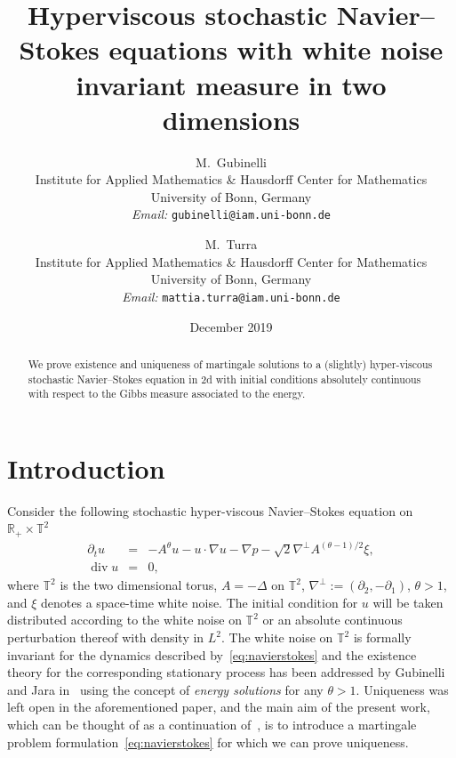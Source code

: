 \documentclass{article}
\newcommand{\assign}{:=}
\newcommand{\nosymbol}{}
\newcommand{\tmaffiliation}[1]{\\ #1}
\newcommand{\tmemail}[1]{\\ \textit{Email:} \texttt{#1}}
\newcommand{\tmop}[1]{\ensuremath{\operatorname{#1}}}
\newcommand{\tmtextit}[1]{{\itshape{#1}}}
\begin{document}
\title{Hyperviscous stochastic Navier--Stokes equations with white noise
invariant measure in two dimensions}

\author{
  M.~Gubinelli
  \tmaffiliation{Institute for Applied Mathematics \& Hausdorff Center for
  Mathematics\\
  University of Bonn, Germany}
  \tmemail{gubinelli@iam.uni-bonn.de}
  \and
  M.~Turra
  \tmaffiliation{Institute for Applied Mathematics \& Hausdorff Center for
  Mathematics\\
  University of Bonn, Germany}
  \tmemail{mattia.turra@iam.uni-bonn.de}
}

\date{December 2019}

\maketitle

\begin{abstract}
  We prove existence and uniqueness of martingale solutions to a (slightly)
  hyper-viscous stochastic Navier--Stokes equation in 2d with initial
  conditions absolutely continuous with respect to the Gibbs measure
  associated to the energy.
\end{abstract}

\section{Introduction}

Consider the following stochastic hyper-viscous Navier--Stokes equation on
$\mathbb{R}_+ \times \mathbb{T}^2$
\begin{equation}
  \begin{array}{lll}
    \partial_t u & = & - A^{\theta} u - u \nosymbol \cdot \nabla u - \nabla p
    - \sqrt{2} \nabla^{\perp} A^{(\theta - 1) / 2} \xi,\\
    \tmop{div} u & = & 0,
  \end{array} \label{eq:navierstokes}
\end{equation}
where $\mathbb{T}^2$ is the two dimensional torus, $A = - \Delta$ on
$\mathbb{T}^2$, $\nabla^{\perp} \assign (\partial_2, - \partial_1)$, $\theta >
1$, and $\xi$ denotes a space-time white noise. The initial condition for $u$
will be taken distributed according to the white noise on $\mathbb{T}^2$ or an
absolute continuous perturbation thereof with density in $L^2$. The white
noise on $\mathbb{T}^2$ is formally invariant for the dynamics described
by~{\eqref{eq:navierstokes}} and the existence theory for the corresponding
stationary process has been addressed by Gubinelli and Jara
in~{\cite{gubinelli2013regularization}} using the concept of \tmtextit{energy
solutions} for any $\theta > 1$. Uniqueness was left open in the
aforementioned paper, and the main aim of the present work, which can be
thought of as a continuation of~{\cite{gubinelli2018infinitesimal}}, is to
introduce a martingale problem formulation~{\eqref{eq:navierstokes}} for which
we can prove uniqueness.
\end{document}
